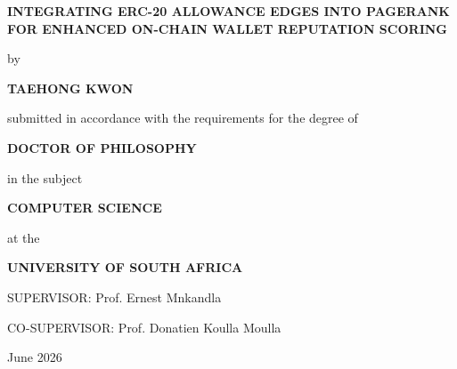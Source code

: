 \begin{titlepage}
\centering
\vspace*{0.4cm}
{\Large\bfseries INTEGRATING ERC-20 ALLOWANCE EDGES INTO PAGERANK FOR ENHANCED ON-CHAIN WALLET REPUTATION SCORING\par}
\vfill
{by\par}
\vspace{0.7cm}
{\large\bfseries TAEHONG KWON\par}
\vfill
{submitted in accordance with the requirements for the degree of\par}
\vspace{0.7cm}
{\large\bfseries DOCTOR OF PHILOSOPHY\par}
\vspace{0.35cm}
{in the subject\par}
\vspace{0.7cm}
{\large\bfseries COMPUTER SCIENCE\par}
\vfill
{at the\par}
\vspace{0.7cm}
{\large\bfseries UNIVERSITY OF SOUTH AFRICA\par}
\vfill
{SUPERVISOR: Prof. Ernest Mnkandla\par}
\vspace{0.35cm}
{CO-SUPERVISOR: Prof. Donatien Koulla Moulla\par}
\vfill
{June 2026\par}
\end{titlepage}
\restoregeometry
